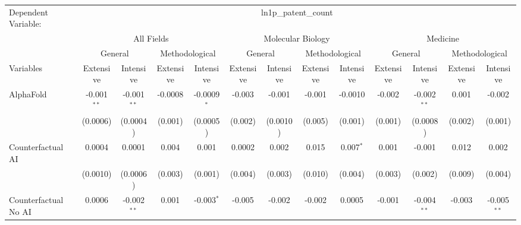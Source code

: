 \begingroup
\centering
\begin{tabular}{lcccccccccccc}
   \tabularnewline \midrule \midrule
   Dependent Variable: & \multicolumn{12}{c}{ln1p\_patent\_count}\\
 & \multicolumn{4}{c}{All Fields} & \multicolumn{4}{c}{Molecular Biology} & \multicolumn{4}{c}{Medicine} \\
\cmidrule(lr){2-5} \cmidrule(lr){6-9} \cmidrule(lr){10-13}
 & \multicolumn{2}{c}{General} & \multicolumn{2}{c}{Methodological} & \multicolumn{2}{c}{General} & \multicolumn{2}{c}{Methodological} & \multicolumn{2}{c}{General} & \multicolumn{2}{c}{Methodological} \\
\cmidrule(lr){2-3} \cmidrule(lr){4-5} \cmidrule(lr){6-7} \cmidrule(lr){8-9} \cmidrule(lr){10-11} \cmidrule(lr){12-13}
Variables & \multicolumn{1}{c}{Extensive} & \multicolumn{1}{c}{Intensive} & \multicolumn{1}{c}{Extensive} & \multicolumn{1}{c}{Intensive} & \multicolumn{1}{c}{Extensive} & \multicolumn{1}{c}{Intensive} & \multicolumn{1}{c}{Extensive} & \multicolumn{1}{c}{Intensive} & \multicolumn{1}{c}{Extensive} & \multicolumn{1}{c}{Intensive} & \multicolumn{1}{c}{Extensive} & \multicolumn{1}{c}{Intensive} \\
\cmidrule(lr){1-1}\cmidrule(lr){2-2} \cmidrule(lr){3-3} \cmidrule(lr){4-4} \cmidrule(lr){5-5} \cmidrule(lr){6-6} \cmidrule(lr){7-7} \cmidrule(lr){8-8} \cmidrule(lr){9-9} \cmidrule(lr){10-10} \cmidrule(lr){11-11} \cmidrule(lr){12-12} \cmidrule(lr){13-13}
   AlphaFold                                & -0.001$^{**}$ & -0.001$^{**}$ & -0.0008 & -0.0009$^{*}$ & -0.003  & -0.001   & -0.001  & -0.0010     & -0.002  & -0.002$^{**}$ & 0.001   & -0.002\\   
                                            & (0.0006)      & (0.0004)      & (0.001) & (0.0005)      & (0.002) & (0.0010) & (0.005) & (0.001)     & (0.001) & (0.0008)      & (0.002) & (0.001)\\   
   Counterfactual AI                        & 0.0004        & 0.0001        & 0.004   & 0.001         & 0.0002  & 0.002    & 0.015   & 0.007$^{*}$ & 0.001   & -0.001        & 0.012   & 0.002\\   
                                            & (0.0010)      & (0.0006)      & (0.003) & (0.001)       & (0.004) & (0.003)  & (0.010) & (0.004)     & (0.003) & (0.002)       & (0.009) & (0.004)\\   
   Counterfactual No AI                     & 0.0006        & -0.002$^{**}$ & 0.001   & -0.003$^{*}$  & -0.005  & -0.002   & -0.002  & 0.0005      & -0.001  & -0.004$^{**}$ & -0.003  & -0.005$^{**}$\\   

\end{tabular}
